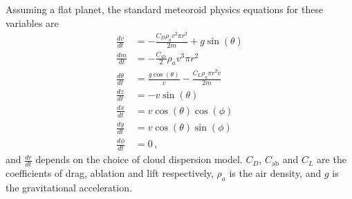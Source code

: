 Assuming a flat planet, the standard meteoroid physics equations \citep[e.g.][]{passey1980effects} for these variables are
\begin{align*}
    \frac{dv}{dt} &= -\frac{C_D \rho_a v^2 \pi r^2}{2m} + g\sin(\theta)\\
    \frac{dm}{dt} &= -\frac{C_\mathrm{ab}}{2}\rho_a v^3 \pi r^2 \\
    \frac{d\theta}{dt} &= \frac{g\cos(\theta)}{v} - \frac{C_L \rho_a \pi r^2 v}{2m} \\
    \frac{dz}{dt} &= -v\sin(\theta) \\
    \frac{dx}{dt} &= v\cos(\theta)\cos(\phi) \\
    \frac{dy}{dt} &= v\cos(\theta)\sin(\phi) \\
    \frac{d\phi}{dt} &= 0\,,
\end{align*}
and $\frac{dr}{dt}$ depends on the choice of cloud dispersion model. $C_D$, $C_\mathrm{ab}$ and $C_L$ are the coefficients of drag, ablation and lift respectively, $\rho_a$ is the air density, and $g$ is the gravitational acceleration.

